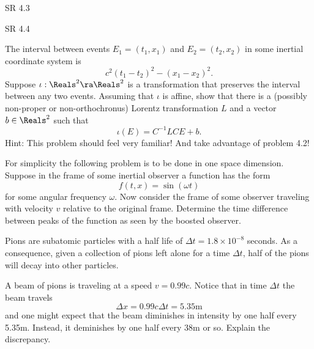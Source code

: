 \documentclass[minion]{homework}
\begin{document}
\begin{aproblems}

\hproblem SR 4.3

\hproblem SR 4.4

\hproblem The interval between events $E_1=(t_1,x_1)$ and $E_2=(t_2,x_2)$ in some inertial coordinate
system is
\begin{equation}
c^2(t_1-t_2)^2 - (x_1-x_2)^2.
\end{equation}
Suppose $\iota:\Reals^2\ra\Reals^2$ is a transformation that preserves the interval between any two
events.  Assuming that $\iota$ is affine, show that there is a (possibly non-proper or non-orthochronus) Lorentz transformation $L$ and a vector $b\in \Reals^2$ such that
\begin{equation}
\iota(E) = C^{-1} L C E + b.
\end{equation}
Hint: This problem should feel very familiar! And take advantage of problem 4.2!

\hproblem For simplicity the following problem is to be done in one space dimension.
Suppose in the frame of some inertial observer a function has the form
\begin{equation}
f(t,x) = \sin(\omega t)
\end{equation}
for some angular frequency $\omega$.  Now consider the frame of some observer traveling
with velocity $v$ relative to the original frame.  Determine the time difference between peaks
of the function as seen by the boosted observer.

\hproblem Pions are subatomic particles with a half life of $\Delta t=1.8\times10^{-8}$ seconds.  As a consequence, given a collection of pions left alone for a time $\Delta t$, half
of the pions will decay into other particles.

A beam of pions is traveling at a speed $v=0.99c$. Notice that in time $\Delta t$ the beam
travels
\begin{equation}
\Delta x = 0.99 c \Delta t = 5.35 \mathrm{m}
\end{equation}
and one might expect that the beam diminishes in intensity by one half every 5.35m.  Instead,
it deminishes by one half every 38m or so.  Explain the discrepancy.
\end{aproblems}
\end{document}
